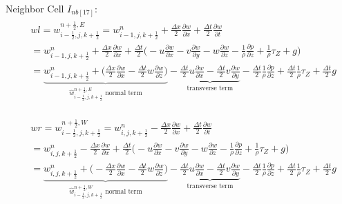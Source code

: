 \documentclass{article}
\numberwithin{equation}{subsection}
\begin{document}
Neighbor Cell $I_{nb[17]}$:
\begin{align}
\begin{split}
& wl = w_{i-\frac{1}{2},j,k+\frac{1}{2}}^{n+\frac{1}{2},E} = w_{i-1,j,k+\frac{1}{2}}^n + \frac{\Delta x}{2}\frac{\partial w}{\partial x} + \frac{\Delta t}{2}\frac{\partial w}{\partial t} \\
&= w_{i-1,j,k+\frac{1}{2}}^n + \frac{\Delta x}{2} \frac{\partial w}{\partial x} + \frac{\Delta t}{2} \Big( -u\frac{\partial w}{\partial x} -v\frac{\partial w}{\partial y} -w\frac{\partial w}{\partial z} - \frac{1}{\rho}\frac{\partial p}{\partial z} +\frac{1}{\rho}\tau_Z + g\Big) \\
&= \underbrace{w_{i-1,j,k+\frac{1}{2}}^n + \Big(\frac{\Delta x}{2}\frac{\partial w}{\partial x} - \frac{\Delta t}{2} w\frac{\partial w}{\partial z}\Big)}_\text{$\widehat{w}_{i-\frac{1}{2},j,k+\frac{1}{2}}^{n+\frac{1}{2},E}$ normal term} -\underbrace{\frac{\Delta t}{2}u\frac{\partial w}{\partial x} - \frac{\Delta t}{2}v\frac{\partial w}{\partial y}}_\text{transverse term} - \frac{\Delta t}{2}\frac{1}{\rho}\frac{\partial p}{\partial z} + \frac{\Delta t}{2}\frac{1}{\rho}\tau_Z + \frac{\Delta t}{2}g
\end{split}
\end{align}

\begin{align}
\begin{split}
& wr = w_{i-\frac{1}{2},j,k+\frac{1}{2}}^{n+\frac{1}{2},W} = w_{i,j,k+\frac{1}{2}}^n - \frac{\Delta x}{2}\frac{\partial w}{\partial x} + \frac{\Delta t}{2}\frac{\partial w}{\partial t} \\
&= w_{i,j,k+\frac{1}{2}}^n - \frac{\Delta x}{2} \frac{\partial w}{\partial x} + \frac{\Delta t}{2} \Big( -u\frac{\partial w}{\partial x} -v\frac{\partial w}{\partial y} -w\frac{\partial w}{\partial z} - \frac{1}{\rho}\frac{\partial p}{\partial z} +\frac{1}{\rho}\tau_Z + g\Big) \\
&= \underbrace{w_{i,j,k+\frac{1}{2}}^n + \Big(-\frac{\Delta x}{2}\frac{\partial w}{\partial x} - \frac{\Delta t}{2} w\frac{\partial w}{\partial z}\Big)}_\text{$\widehat{w}_{i-\frac{1}{2},j,k+\frac{1}{2}}^{n+\frac{1}{2},W}$ normal term} -\underbrace{\frac{\Delta t}{2}u\frac{\partial w}{\partial x} - \frac{\Delta t}{2}v\frac{\partial w}{\partial y}}_\text{transverse term} - \frac{\Delta t}{2}\frac{1}{\rho}\frac{\partial p}{\partial z} + \frac{\Delta t}{2}\frac{1}{\rho}\tau_Z + \frac{\Delta t}{2}g
\end{split}
\end{align}
\end{document}
